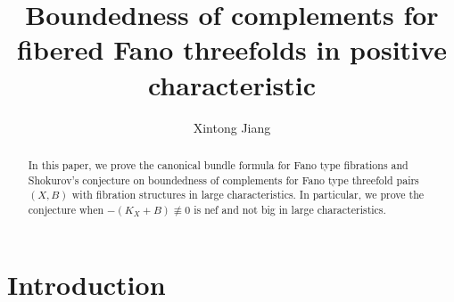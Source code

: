 \documentclass[letterpaper,reqno,12pt]{amsart}
\title{Boundedness of complements for fibered Fano threefolds in positive characteristic}
\author{Xintong Jiang}
\date{}
\numberwithin{equation}{section}
\theoremstyle{plain}
\begin{document}
\begin{abstract}
    In this paper, we prove the canonical bundle formula for Fano type fibrations and Shokurov's conjecture on boundedness of complements for Fano type threefold pairs $(X,B)$ with fibration structures in large characteristics. In particular, we prove the conjecture when $-(K_X+B)\not\equiv 0$ is nef and not big in large characteristics.
\end{abstract}
\maketitle
{}
\tableofcontents
\section{Introduction}
\end{document}

